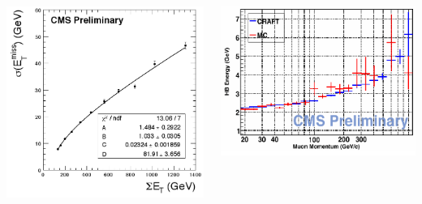 \documentclass[compress]{beamer}
\begin{document}
\begin{frame}
\begin{columns}
\includegraphics[width=\linewidth]{missing_energy_resolution.png}

\includegraphics[width=\linewidth]{HCAL_muon_response.png}


\end{columns}
\label{missing_energy}
\end{frame}
\end{document}
